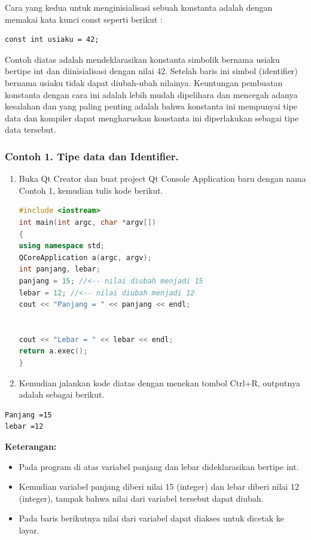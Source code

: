 Cara yang kedua untuk menginisialisasi sebuah konstanta adalah dengan
memakai kata kunci const seperti berikut :

\begin{verbatim}
const int usiaku = 42;
\end{verbatim}

Contoh diatas adalah mendeklarasikan konstanta simbolik bernama usiaku
bertipe int dan diinisialisasi dengan nilai 42. Setelah baris ini simbol
(identifier) bernama usiaku tidak dapat diubah-ubah nilainya. Keuntungan
pembuatan konstanta dengan cara ini adalah lebih mudah dipelihara dan
mencegah adanya kesalahan dan yang paling penting adalah bahwa konstanta
ini mempunyai tipe data dan kompiler dapat mengharuskan konstanta ini
diperlakukan sebagai tipe data tersebut.

\subsubsection{Contoh 1. Tipe data dan Identifier.}

\begin{enumerate}
\def\labelenumi{\arabic{enumi}.}
\item
  Buka Qt Creator dan buat project Qt Console Application baru dengan
  nama Contoh 1, kemudian tulis kode berikut.

\begin{lstlisting}[language=c++]
#include <iostream>
int main(int argc, char *argv[])
{
using namespace std;
QCoreApplication a(argc, argv);
int panjang, lebar;
panjang = 15; //<-- nilai diubah menjadi 15
lebar = 12; //<-- nilai diubah menjadi 12
cout << "Panjang = " << panjang << endl;


cout << "Lebar = " << lebar << endl;
return a.exec();
}
\end{lstlisting}
\item
  Kemudian jalankan kode diatas dengan menekan tombol Ctrl+R, outputnya
  adalah sebagai berikut.
\end{enumerate}
\begin{verbatim}
Panjang =15
lebar =12
\end{verbatim}


\textbf{Keterangan:}

\begin{itemize}
\tightlist
\item
  Pada program di atas variabel panjang dan lebar dideklarasikan bertipe
  int.
\item
  Kemudian variabel panjang diberi nilai 15 (integer) dan lebar diberi
  nilai 12 (integer), tampak bahwa nilai dari variabel tersebut dapat
  diubah.
\item
  Pada baris berikutnya nilai dari variabel dapat diakses untuk dicetak
  ke layar.
\end{itemize}

